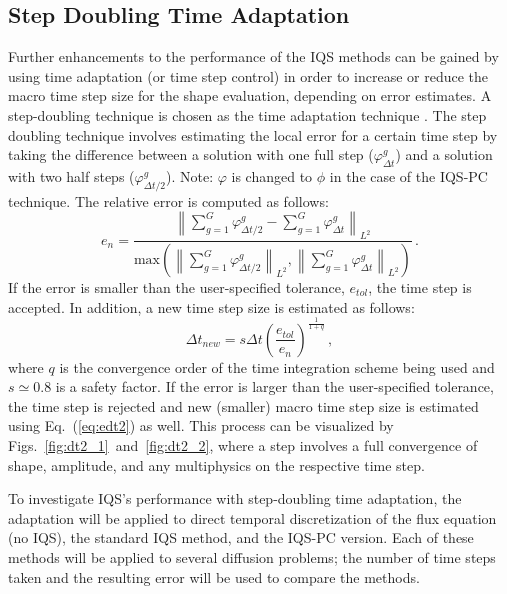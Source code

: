 \documentclass{elsarticle}
\newcommand{\eqt}[1]{Eq.~(\ref{#1})}                     %
\newcommand{\figs}[2]{Figs.~\ref{#1}~and~\ref{#2}}		%
\newcommand{\iqspc}{IQS-PC\xspace}
\newcommand{\be}{\begin{equation}}
\newcommand{\ee}{\end{equation}}
\newcommand{\norm}[1]{\left\lVert#1\right\rVert_{L^2}}
\begin{document}
\subsection{Step Doubling Time Adaptation}

Further enhancements to the performance of the IQS methods can be gained by using time adaptation (or time step control) in order to increase or reduce the macro time step size for the shape evaluation, depending on error estimates. A step-doubling technique is chosen as the time adaptation technique \cite{NumC}. The step doubling technique involves estimating the local error for a certain time step by taking the difference between a solution with one full step ($\varphi^g_{\Delta t}$) and a solution with two half steps ($\varphi^g_{\Delta t/2}$). Note: $\varphi$ is changed to $\phi$ in the case of the \iqspc technique. The relative error is computed as follows:
\be
e_n = \frac{\norm{\sum_{g=1}^G\varphi^g_{\Delta t/2} - \sum_{g=1}^G\varphi^g_{\Delta t}}}{\text{max}\left(\norm{\sum_{g=1}^G\varphi^g_{\Delta t/2}},\norm{\sum_{g=1}^G\varphi^g_{\Delta t}}\right)} \,.
\label{eq:edt2}
\ee
If the error is smaller than the user-specified tolerance, $e_{tol}$, the time step is accepted. In addition, a new time step size is estimated as follows:
\be
\Delta t_{new} = s \Delta t \left(\frac{e_{tol}}{e_n}\right)^{\frac{1}{1+q}} \,,
\label{eq:dt2}
\ee
where $q$ is the convergence order of the time integration scheme being used and $s\simeq 0.8$ is a safety factor. If the error is larger than the user-specified tolerance, the time step is rejected and new (smaller) macro time step size is estimated using \eqt{eq:edt2} as well. This process can be visualized by \figs{fig:dt2_1}{fig:dt2_2}, where a step involves a full convergence of shape, amplitude, and any multiphysics on the respective time step.

To investigate IQS's performance with step-doubling time adaptation, the adaptation will be applied to direct temporal discretization of the flux equation (no IQS), the standard IQS method, and the \iqspc version. Each of these methods will be applied to several diffusion problems; the number of time steps taken and the resulting error will be used to compare the methods.
\end{document}
